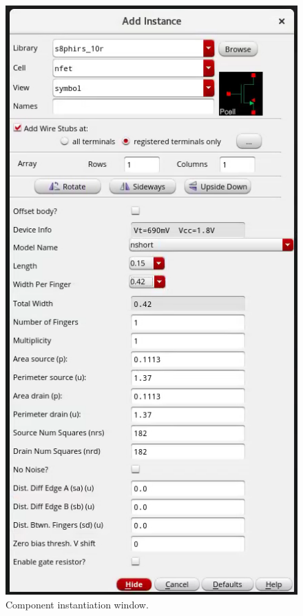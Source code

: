\begin{enumerate}
	
	\parbox[t]{\dimexpr\textwidth-\leftmargin}{%
		\begin{figure}
			\vspace{-0mm}
			\centering
			\vspace{-\baselineskip}
			\includegraphics[scale=0.35]{figures/lab1_schematic_sim/instanciate}
			\caption{Component instantiation window.}
			\label{fig_instantiate}
		\end{figure}
		
}
\end{enumerate}
